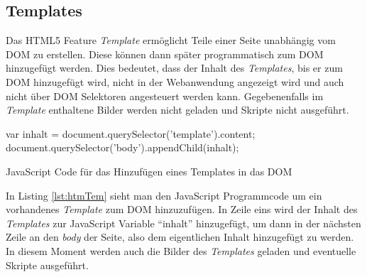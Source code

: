 \documentclass[12pt, paper=a4, bibtotoc, toc=listof, headsepline=true]{scrreprt}
\begin{document}
		\subsection{Templates}
		\label{subsec:Templates}
		Das \ac{HTML5} Feature \emph{Template} ermöglicht Teile einer Seite unabhängig vom \ac{DOM} zu erstellen. Diese können dann später programmatisch zum \ac{DOM} hinzugefügt werden.\cite[vgl. S.177]{Cameron2015} Dies bedeutet, dass der Inhalt des \emph{Templates}, bis er zum \ac{DOM} hinzugefügt wird, nicht in der Webanwendung angezeigt wird und auch nicht über \ac{DOM} Selektoren angesteuert werden kann. Gegebenenfalls im \emph{Template} enthaltene Bilder werden nicht geladen und Skripte nicht ausgeführt.\cite[vgl.]{Potschien2013} 
		\begin{listing}
			\begin{JavaScriptcode*}{}
var inhalt = document.querySelector('template').content;
document.querySelector('body').appendChild(inhalt);
			\end{JavaScriptcode*}
			\caption{JavaScript Code für das Hinzufügen eines Templates in das DOM}
			\label{lst:htmTem}
		\end{listing}
		In Listing \ref{lst:htmTem} sieht man den JavaScript Programmcode um ein vorhandenes \emph{Template} zum \ac{DOM} hinzuzufügen. In Zeile eins wird der Inhalt des \emph{Templates} zur JavaScript Variable \enquote{inhalt} hinzugefügt, um dann in der nächsten Zeile an den \emph{body} der Seite, also dem eigentlichen Inhalt hinzugefügt zu werden. In diesem Moment werden auch die Bilder des \emph{Templates} geladen und eventuelle Skripte ausgeführt.
\end{document}
